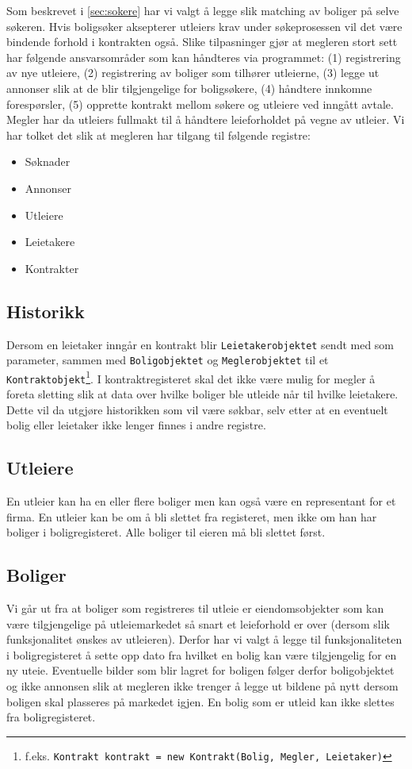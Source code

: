 Som beskrevet i \ref{sec:sokere} har vi valgt å legge slik matching av boliger på selve søkeren. Hvis boligsøker aksepterer utleiers krav under søkeprosessen vil det være bindende forhold i kontrakten også. Slike tilpasninger gjør at megleren stort sett har følgende ansvarsområder som kan håndteres via programmet: (1) registrering av nye utleiere, (2) registrering av boliger som tilhører utleierne, (3) legge ut annonser slik at de blir tilgjengelige for boligsøkere, (4) håndtere innkomne forespørsler, (5) opprette kontrakt mellom søkere og utleiere ved inngått avtale. Megler har da utleiers fullmakt til å håndtere leieforholdet på vegne av utleier. 
Vi har tolket det slik at megleren har tilgang til følgende registre:
\begin{itemize}
\item Søknader
\item Annonser
\item Utleiere
\item Leietakere
\item Kontrakter
\end{itemize}

\subsection{Historikk}
Dersom en leietaker inngår en kontrakt blir \texttt{Leietakerobjektet} sendt med som parameter, sammen med \texttt{Boligobjektet} og \texttt{Meglerobjektet} til et \texttt{Kontraktobjekt}\footnote{f.eks. \texttt{Kontrakt kontrakt = new Kontrakt(Bolig, Megler, Leietaker)}}. I kontraktregisteret skal det ikke være mulig for megler å foreta sletting slik at data over hvilke boliger ble utleide når til hvilke leietakere. Dette vil da utgjøre historikken som vil være søkbar, selv etter at en eventuelt bolig eller leietaker ikke lenger finnes i andre registre.

\subsection{Utleiere}
En utleier kan ha en eller flere boliger men kan også være en representant for et firma. En utleier kan be om å bli slettet fra registeret, men ikke om han har boliger i boligregisteret. Alle boliger til eieren må bli slettet først.

\subsection{Boliger}
Vi går ut fra at boliger som registreres til utleie er eiendomsobjekter som kan være tilgjengelige på utleiemarkedet så snart et leieforhold er over (dersom slik funksjonalitet ønskes av utleieren). Derfor har vi valgt å legge til funksjonaliteten i boligregisteret å sette opp dato fra hvilket en bolig kan være tilgjengelig for en ny uteie. Eventuelle bilder som blir lagret for boligen følger derfor boligobjektet og ikke annonsen slik at megleren ikke trenger å legge ut bildene på nytt dersom boligen skal plasseres på markedet igjen. En bolig som er utleid kan ikke slettes fra boligregisteret.

